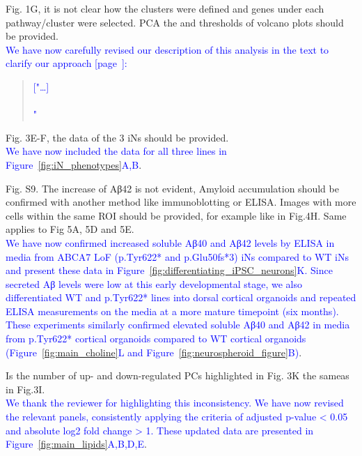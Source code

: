 Fig. 1G, it is not clear how the clusters were defined and genes under each pathway/cluster were selected. PCA the and thresholds of volcano plots should be provided.\\
\textcolor{blue}{We have now carefully revised our description of this analysis in the text to clarify our approach [page~\pageref{quoteF-label}]:}
\begin{quote}
	\textcolor{blue}{["\dots]} \quoteF\\\\
	\quoteG\textcolor{blue}{"}
\end{quote}

Fig. 3E-F, the data of the 3 iNs should be provided.\\
\textcolor{blue}{We have now included the data for all three lines in Figure~\ref{fig:iN_phenotypes}A,B}.

Fig. S9. The increase of Aβ42 is not evident, Amyloid accumulation should be confirmed with another method like immunoblotting or ELISA. Images with more cells within the same ROI should be provided, for example like in Fig.4H. Same applies to Fig 5A, 5D and 5E.\\
\textcolor{blue}{We have now confirmed increased soluble Aβ40 and Aβ42 levels by ELISA in media from ABCA7 LoF (p.Tyr622* and p.Glu50fs*3) iNs compared to WT iNs and present these data in Figure~\ref{fig:differentiating_iPSC_neurons}K. Since secreted Aβ levels were low at this early developmental stage, we also differentiated WT and p.Tyr622* lines into dorsal cortical organoids and repeated ELISA measurements on the media at a more mature timepoint (six months). These experiments similarly confirmed elevated soluble Aβ40 and Aβ42 in media from p.Tyr622* cortical organoids compared to WT cortical organoids (Figure~\ref{fig:main_choline}L and Figure~\ref{fig:neurospheroid_figure}B)}.

Is the number of up- and down-regulated PCs highlighted in Fig. 3K the sameas in Fig.3I.\\
\textcolor{blue}{We thank the reviewer for highlighting this inconsistency. We have now revised the relevant panels, consistently applying the criteria of adjusted p-value < 0.05 and absolute log2 fold change > 1. These updated data are presented in Figure~\ref{fig:main_lipids}A,B,D,E}.

